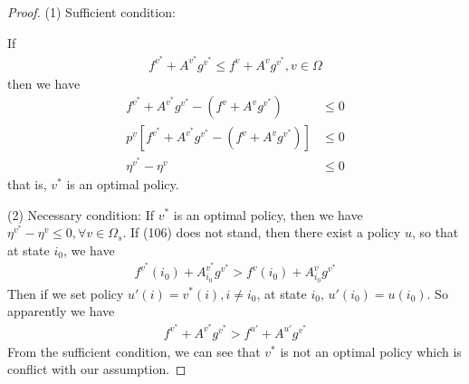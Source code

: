 \documentclass[runningheads]{llncs}
\begin{document}
    \subsection{}
    \begin{proof}
        \par
        (1) Sufficient condition:
        \par
        If
        \begin{align}
            f^{v^*} + A^{v^*} g^{v^*} \leq f^v + A^v g^{v^*}, v \in \Omega
        \end{align}
        then we have
        \begin{align}
            f^{v^*} + A^{v^*} g^{v^*} - (f^v + A^v g^{v^*}) &\leq 0 \\
            p^v[f^{v^*} + A^{v^*} g^{v^*} - (f^v + A^v g^{v^*})] &\leq 0 \\
            \eta^{v^*} - \eta^v &\leq 0
        \end{align}
        that is, $v^*$ is an optimal policy.
        \par
        (2) Necessary condition:
        If $v^*$ is an optimal policy, then we have $\eta^{v^*} - \eta^v \leq 0, \forall v \in \Omega_s$.
        If (106) does not stand, then there exist a policy $u$, so that at state $i_0$, we have
        \begin{align}
            f^{v^*}(i_0) + A_{i_0}^{v^*} g^{v^*} > f^v(i_0) + A_{i_0}^v g^{v^*}
        \end{align}
        Then if we set policy $u'(i) = v^*(i), i \neq i_0$, at state $i_0$, $u'(i_0) = u(i_0)$.
        So apparently we have
        \begin{align}
            f^{v^*} + A^{v^*} g^{v^*} > f^{u'} + A^{u'} g^{v^*}
        \end{align}
        From the sufficient condition, we can see that $v^*$ is not an optimal policy which is conflict with
        our assumption.
    \end{proof}
\end{document}

